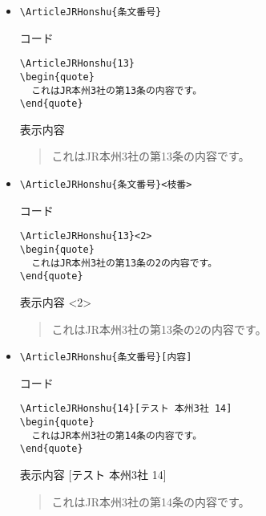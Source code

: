 \documentclass[oneside,10pt,a4paper]{jsarticle}
\begin{document}
  \begin{itemize}
    \item \verb|\ArticleJRHonshu{条文番号}|
      \begin{itembox}[l]{コード}
        {\footnotesize\begin{verbatim}
\ArticleJRHonshu{13}
\begin{quote}
  これはJR本州3社の第13条の内容です。
\end{quote}\end{verbatim}}
      \end{itembox}
      \begin{itembox}[l]{表示内容}
        \begin{quote}
          これはJR本州3社の第13条の内容です。
        \end{quote}
      \end{itembox}
    \item \verb|\ArticleJRHonshu{条文番号}<枝番>|
      \begin{itembox}[l]{コード}
        {\footnotesize\begin{verbatim}
\ArticleJRHonshu{13}<2>
\begin{quote}
  これはJR本州3社の第13条の2の内容です。
\end{quote}\end{verbatim}}
      \end{itembox}
      \begin{itembox}[l]{表示内容}
        <2>
        \begin{quote}
          これはJR本州3社の第13条の2の内容です。
        \end{quote}
      \end{itembox}
    \newpage
    \item \verb|\ArticleJRHonshu{条文番号}[内容]|
      \begin{itembox}[l]{コード}
        {\footnotesize\begin{verbatim}
\ArticleJRHonshu{14}[テスト 本州3社 14]
\begin{quote}
  これはJR本州3社の第14条の内容です。
\end{quote}\end{verbatim}}
      \end{itembox}
      \begin{itembox}[l]{表示内容}
        [テスト 本州3社 14]
        \begin{quote}
          これはJR本州3社の第14条の内容です。
        \end{quote}

\end{itembox}
\end{itemize}
\end{document}

